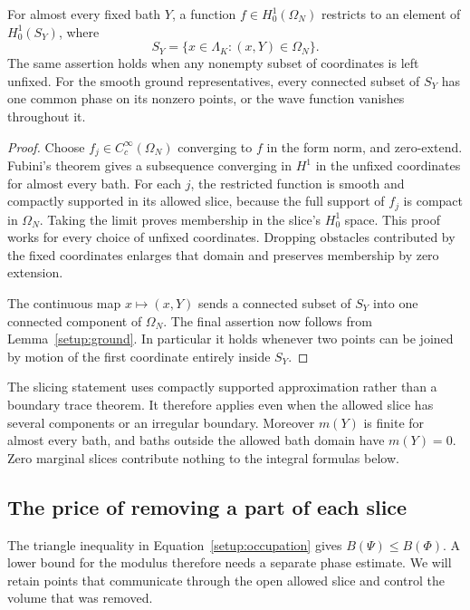 \begin{lemma}\label{setup:slices}
For almost every fixed bath $Y$, a function $f\in H_0^1(\Omega_N)$
restricts to an element of $H_0^1(S_Y)$, where
\[
 S_Y=\{x\in\Lambda_K:(x,Y)\in\Omega_N\}.
\]
The same assertion holds when any nonempty subset of coordinates is
left unfixed. For the smooth ground representatives, every connected
subset of $S_Y$ has one common phase on its nonzero points, or the wave
function vanishes throughout it.
\end{lemma}

\begin{proof}
Choose $f_j\in C_c^\infty(\Omega_N)$ converging to $f$ in the form
norm, and zero-extend. Fubini's theorem gives a subsequence converging
in $H^1$ in the unfixed coordinates for almost every bath. For each
$j$, the restricted function is smooth and compactly supported in its
allowed slice, because the full support of $f_j$ is compact in
$\Omega_N$. Taking the limit proves membership in the slice's
$H_0^1$ space. This proof works for every choice of unfixed coordinates.
Dropping obstacles contributed by the fixed coordinates enlarges that
domain and preserves membership by zero extension.

The continuous map $x\mapsto(x,Y)$ sends a connected subset of $S_Y$
into one connected component of $\Omega_N$. The final assertion now
follows from Lemma~\ref{setup:ground}. In particular it holds whenever
two points can be joined by motion of the first coordinate entirely
inside $S_Y$.
\end{proof}

The slicing statement uses compactly supported approximation rather
than a boundary trace theorem. It therefore applies even when the
allowed slice has several components or an irregular boundary.
Moreover $m(Y)$ is finite for almost every bath, and baths outside the
allowed bath domain have $m(Y)=0$. Zero marginal slices contribute
nothing to the integral formulas below.

\subsection{The price of removing a part of each slice}

The triangle inequality in Equation~\eqref{setup:occupation} gives
$B(\Psi)\le B(\Phi)$. A lower bound for the modulus therefore needs a
separate phase estimate. We will retain points that communicate through
the open allowed slice and control the volume that was removed.

